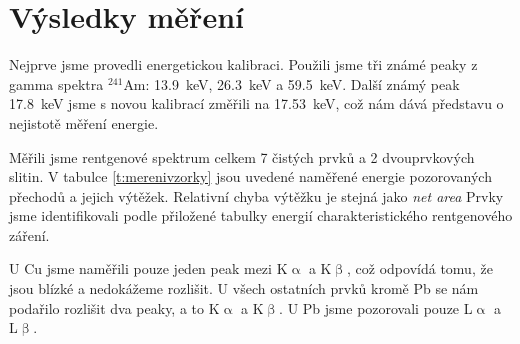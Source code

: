 \section*{Výsledky měření}
Nejprve jsme provedli energetickou kalibraci. Použili jsme tři známé peaky z gamma spektra $^{241}$Am: \SI{13.9}{\keV}, \SI{26.3}{\keV} a \SI{59.5}{\keV}. Další známý peak \SI{17.8}{\keV} jsme s novou kalibrací změřili na \SI{17.53}{\keV}, což nám dává představu o nejistotě měření energie.

Měřili jsme rentgenové spektrum celkem 7 čistých prvků a 2 dvouprvkových slitin. V tabulce \ref{t:merenivzorky} jsou uvedené naměřené energie pozorovaných přechodů a jejich výtěžek. Relativní chyba výtěžku je stejná jako \emph{net area} Prvky jsme identifikovali podle přiložené tabulky energií charakteristického rentgenového záření.

U Cu jsme naměřili pouze jeden peak mezi K$\upalpha$ a K$\upbeta$, což odpovídá tomu, že jsou blízké a nedokážeme rozlišit. U všech ostatních prvků kromě Pb se nám podařilo rozlišit dva peaky, a to K$\upalpha$ a K$\upbeta$. U Pb jsme pozorovali pouze L$\upalpha$ a L$\upbeta$.

